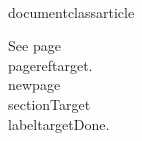 \\documentclass{article}
\begin{document}
See page~\\pageref{target}.\\newpage\\section{Target}\\label{target}Done.\
\end{document}
